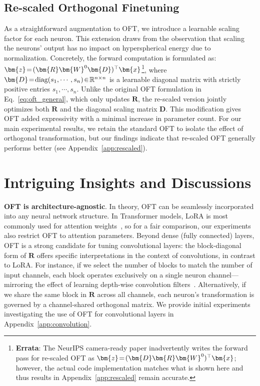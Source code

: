 \subsection{Re-scaled Orthogonal Finetuning}

As a straightforward augmentation to OFT, we introduce a learnable scaling factor for each neuron. This extension draws from the observation that scaling the neurons' output has no impact on hyperspherical energy due to normalization. Concretely, the forward computation is formulated as: $\thickmuskip=2mu \medmuskip=2mu\bm{z}=(\bm{R}\bm{W}^0\bm{D})^\top\bm{x}$\footnote{\textbf{Errata}: The NeurIPS camera-ready paper inadvertently writes the forward pass for re-scaled OFT as $\thickmuskip=2mu \medmuskip=2mu\bm{z}=(\bm{D}\bm{R}\bm{W}^0)^\top\bm{x}$; however, the actual code implementation matches what is shown here and thus results in Appendix~\ref{app:rescaled} remain accurate.}, where $\thickmuskip=2mu \medmuskip=2mu \bm{D}=\text{diag}(s_1,\cdots,s_n)\in\mathbb{R}^{n\times n}$ is a learnable diagonal matrix with strictly positive entries $s_1,\cdots,s_n$. Unlike the original OFT formulation in Eq.~\eqref{eq:oft_general}, which only updates $\bm{R}$, the re-scaled version jointly optimizes both $\bm{R}$ and the diagonal scaling matrix $\bm{D}$. This modification gives OFT added expressivity with a minimal increase in parameter count. For our main experimental results, we retain the standard OFT to isolate the effect of orthogonal transformation, but our findings indicate that re-scaled OFT generally performs better (see Appendix~\ref{app:rescaled}).

\section{Intriguing Insights and Discussions}

\textbf{OFT is architecture-agnostic}. In theory, OFT can be seamlessly incorporated into any neural network structure. In Transformer models, LoRA is most commonly used for attention weights~\cite{hulora2022}, so for a fair comparison, our experiments also restrict OFT to attention parameters. Beyond dense (fully connected) layers, OFT is a strong candidate for tuning convolutional layers: the block-diagonal form of $\bm{R}$ offers specific interpretations in the context of convolutions, in contrast to LoRA. For instance, if we select the number of blocks to match the number of input channels, each block operates exclusively on a single neuron channel—mirroring the effect of learning depth-wise convolution filters~\cite{chollet2017xception}. Alternatively, if we share the same block in $\bm{R}$ across all channels, each neuron's transformation is governed by a channel-shared orthogonal matrix. We provide initial experiments investigating the use of OFT for convolutional layers in Appendix~\ref{app:convolution}.


